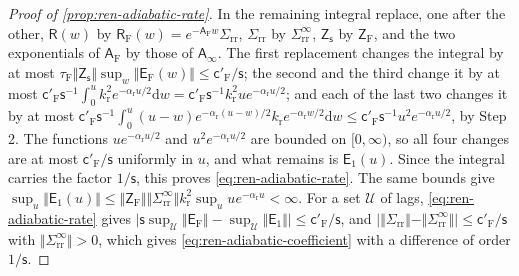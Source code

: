 \begin{proof}[Proof of \cref{prop:ren-adiabatic-rate}]
In the remaining integral replace, one after the other, $\mathsf R(w)$ by $\mathsf R_{\mathrm F}(w)=e^{-\mathsf A_{\mathrm F}w}\Sigma_{\mathrm{rr}}$, $\Sigma_{\mathrm{rr}}$ by $\Sigma^\infty_{\mathrm{rr}}$, $\mathsf Z_{\mathsf s}$ by $\mathsf Z_{\mathrm F}$, and the two exponentials of $\mathsf A_{\mathrm F}$ by those of $\mathsf A_\infty$. The first replacement changes the integral by at most $\tau_{\mathrm F}\Vert\mathsf Z_{\mathsf s}\Vert\sup_w\Vert\mathsf E_{\mathrm F}(w)\Vert\le\mathsf c'_{\mathrm F}/\mathsf s$; the second and the third change it by at most $\mathsf c'_{\mathrm F}\mathsf s^{-1}\int_0^uk_{\mathrm r}^2e^{-\alpha_{\mathrm r}u/2}\mathrm dw=\mathsf c'_{\mathrm F}\mathsf s^{-1}k_{\mathrm r}^2ue^{-\alpha_{\mathrm r}u/2}$; and each of the last two changes it by at most $\mathsf c'_{\mathrm F}\mathsf s^{-1}\int_0^u(u-w)e^{-\alpha_{\mathrm r}(u-w)/2}k_{\mathrm r}e^{-\alpha_{\mathrm r}w/2}\mathrm dw\le\mathsf c'_{\mathrm F}\mathsf s^{-1}u^2e^{-\alpha_{\mathrm r}u/2}$, by Step 2. The functions $ue^{-\alpha_{\mathrm r}u/2}$ and $u^2e^{-\alpha_{\mathrm r}u/2}$ are bounded on $[0,\infty)$, so all four changes are at most $\mathsf c'_{\mathrm F}/\mathsf s$ uniformly in $u$, and what remains is $\mathsf E_1(u)$. Since the integral carries the factor $1/\mathsf s$, this proves \eqref{eq:ren-adiabatic-rate}. The same bounds give $\sup_u\Vert\mathsf E_1(u)\Vert\le\Vert\mathsf Z_{\mathrm F}\Vert\Vert\Sigma^\infty_{\mathrm{rr}}\Vert k_{\mathrm r}^2\sup_uue^{-\alpha_{\mathrm r}u}<\infty$. For a set $\mathcal U$ of lags, \eqref{eq:ren-adiabatic-rate} gives $\lvert\mathsf s\sup_{\mathcal U}\Vert\mathsf E_{\mathrm F}\Vert-\sup_{\mathcal U}\Vert\mathsf E_1\Vert\rvert\le\mathsf c'_{\mathrm F}/\mathsf s$, and $\lvert\Vert\Sigma_{\mathrm{rr}}\Vert-\Vert\Sigma^\infty_{\mathrm{rr}}\Vert\rvert\le\mathsf c'_{\mathrm F}/\mathsf s$ with $\Vert\Sigma^\infty_{\mathrm{rr}}\Vert>0$, which gives \eqref{eq:ren-adiabatic-coefficient} with a difference of order $1/\mathsf s$.


\end{proof}
